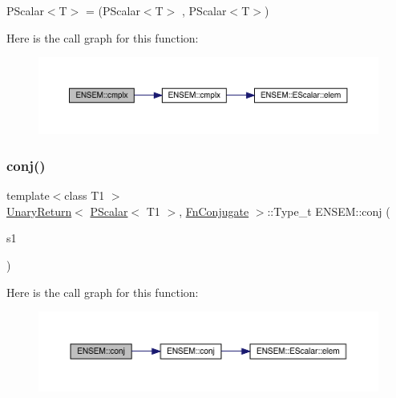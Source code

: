 P\+Scalar$<$\+T$>$ = (P\+Scalar$<$\+T$>$ , P\+Scalar$<$\+T$>$) 

Here is the call graph for this function\+:\nopagebreak
\begin{figure}[H]
\begin{center}
\leavevmode
\includegraphics[width=350pt]{db/dcc/group__primscalar_ga72cf1623c0ae655c15db12ad096194dc_cgraph}
\end{center}
\end{figure}
\mbox{\label{group__primscalar_ga751a721817d2276b8eeda384b67ffa2a}} 
\subsubsection{\texorpdfstring{conj()}{conj()}}
{\footnotesize\ttfamily template$<$class T1 $>$ \\
\mbox{\hyperlink{structENSEM_1_1UnaryReturn}{Unary\+Return}}$<$ \mbox{\hyperlink{classENSEM_1_1PScalar}{P\+Scalar}}$<$ T1 $>$, \mbox{\hyperlink{structENSEM_1_1FnConjugate}{Fn\+Conjugate}} $>$\+::Type\+\_\+t E\+N\+S\+E\+M\+::conj (\begin{DoxyParamCaption}\item[{const \mbox{\hyperlink{classENSEM_1_1PScalar}{P\+Scalar}}$<$ T1 $>$ \&}]{s1 }\end{DoxyParamCaption})\hspace{0.3cm}{\ttfamily [inline]}}

Here is the call graph for this function\+:\nopagebreak
\begin{figure}[H]
\begin{center}
\leavevmode
\includegraphics[width=350pt]{db/dcc/group__primscalar_ga751a721817d2276b8eeda384b67ffa2a_cgraph}
\end{center}
\end{figure}
\mbox{\label{group__primscalar_gae14d6fea866a875601cb8d100fc8b3c2}} 
